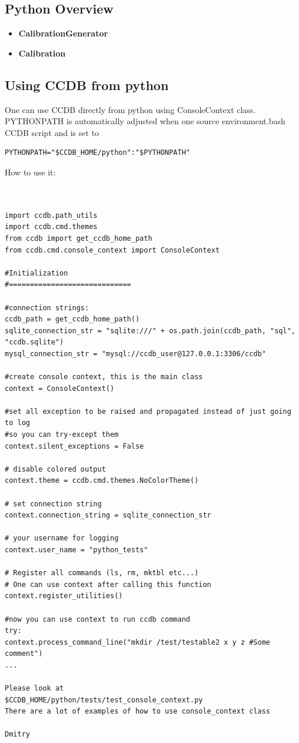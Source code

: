 \documentclass{article}
\begin{document}
\subsection{Python Overview}\label{sec:python_overview}
\begin{itemize}
  \item \textbf{CalibrationGenerator}
  \item \textbf{Calibration}
\end{itemize}

\subsection{Using CCDB from python}
One can use CCDB directly from python using ConsoleContext class.
PYTHONPATH is automatically adjusted when one source environment.bash CCDB script
and is set to
\begin{verbatim}
PYTHONPATH="$CCDB_HOME/python":"$PYTHONPATH"
\end{verbatim}


How to use it:
\begin{verbatim}


import ccdb.path_utils
import ccdb.cmd.themes
from ccdb import get_ccdb_home_path
from ccdb.cmd.console_context import ConsoleContext

#Initialization
#=============================

#connection strings:
ccdb_path = get_ccdb_home_path()
sqlite_connection_str = "sqlite:///" + os.path.join(ccdb_path, "sql", "ccdb.sqlite")
mysql_connection_str = "mysql://ccdb_user@127.0.0.1:3306/ccdb"

#create console context, this is the main class
context = ConsoleContext()

#set all exception to be raised and propagated instead of just going to log
#so you can try-except them
context.silent_exceptions = False  

# disable colored output
context.theme = ccdb.cmd.themes.NoColorTheme()

# set connection string
context.connection_string = sqlite_connection_str  

# your username for logging
context.user_name = "python_tests"

# Register all commands (ls, rm, mktbl etc...)
# One can use context after calling this function
context.register_utilities()

#now you can use context to run ccdb command
try:
context.process_command_line("mkdir /test/testable2 x y z #Some comment")
...

Please look at
$CCDB_HOME/python/tests/test_console_context.py
There are a lot of examples of how to use console_context class

Dmitry

\end{verbatim}
\end{document}

